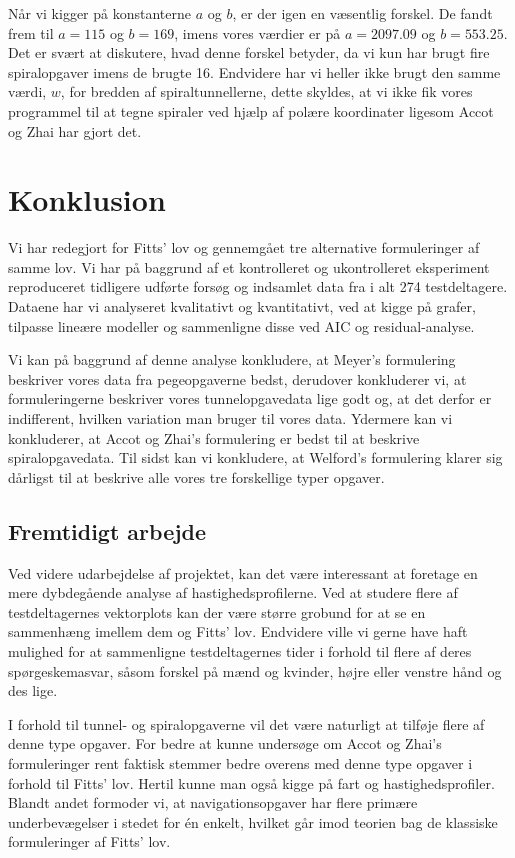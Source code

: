 Når vi kigger på konstanterne $a$ og $b$, er der igen en væsentlig forskel. De fandt frem til $a=115$ og $b=169$, imens vores værdier er på $a=2097.09$ og $b=553.25$. Det er svært at diskutere, hvad denne forskel betyder, da vi kun har brugt fire spiralopgaver imens de brugte 16. Endvidere har vi heller ikke brugt den samme værdi, $w$, for bredden af spiraltunnellerne, dette skyldes, at vi ikke fik vores programmel til at tegne spiraler ved hjælp af polære koordinater ligesom Accot og Zhai har gjort det.

\chapter*{Konklusion}
Vi har redegjort for Fitts' lov og gennemgået tre alternative formuleringer af samme lov. Vi har på baggrund af et kontrolleret og ukontrolleret eksperiment reproduceret tidligere udførte forsøg og indsamlet data fra i alt 274 testdeltagere. Dataene har vi analyseret kvalitativt og kvantitativt, ved at kigge på grafer, tilpasse lineære modeller og sammenligne disse ved AIC og residual-analyse. 

Vi kan på baggrund af denne analyse konkludere, at Meyer's formulering beskriver vores data fra pegeopgaverne bedst, derudover konkluderer vi, at formuleringerne beskriver vores tunnelopgavedata lige godt og, at det derfor er indifferent, hvilken variation man bruger til vores data. Ydermere kan vi konkluderer, at Accot og Zhai's formulering er bedst til at beskrive spiralopgavedata. Til sidst kan vi konkludere, at Welford's formulering klarer sig dårligst til at beskrive alle vores tre forskellige typer opgaver.

\section*{Fremtidigt arbejde}
Ved videre udarbejdelse af projektet, kan det være interessant at foretage en mere dybdegående analyse af hastighedsprofilerne. Ved at studere flere af testdeltagernes vektorplots kan der være større grobund for at se en sammenhæng imellem dem og Fitts' lov. Endvidere ville vi gerne have haft mulighed for at sammenligne testdeltagernes tider i forhold til flere af deres spørgeskemasvar, såsom forskel på mænd og kvinder, højre eller venstre hånd og des lige.

I forhold til tunnel- og spiralopgaverne vil det være naturligt at tilføje flere af denne type opgaver. For bedre at kunne undersøge om Accot og Zhai's formuleringer rent faktisk stemmer bedre overens med denne type opgaver i forhold til Fitts' lov. Hertil kunne man også kigge på fart og hastighedsprofiler. Blandt andet formoder vi, at navigationsopgaver har flere primære underbevægelser i stedet for én enkelt, hvilket går imod teorien bag de klassiske formuleringer af Fitts' lov.


